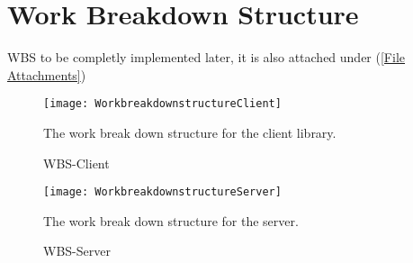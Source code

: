 \section{Work Breakdown Structure}\label{Work Breakdown Structure}
    WBS to be completly implemented later, it is also attached under (\ref{File Attachments})
    
        \begin{figure}[H]
            \centering
            \texttt{[image: WorkbreakdownstructureClient]}
            \caption{WBS-Client}
            The work break down structure for the client library.
            \label{fig:WorkbreakdownstructureClient}
        \end{figure}
        
        \begin{figure}[H]
            \centering
            \texttt{[image: WorkbreakdownstructureServer]}
            \caption{WBS-Server}
            The work break down structure for the server.
            \label{fig:WorkbreakdownstructureServer}
        \end{figure}
